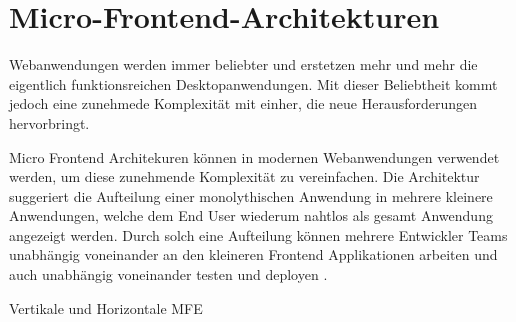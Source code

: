 \chapter{Micro-Frontend-Architekturen}
\label{ch:background}
Webanwendungen werden immer beliebter und erstetzen mehr und mehr die eigentlich funktionsreichen Desktopanwendungen. Mit dieser Beliebtheit kommt jedoch eine zunehmede Komplexität mit einher, die neue Herausforderungen hervorbringt. 

Micro Frontend Architekuren können in modernen Webanwendungen verwendet werden, um diese zunehmende Komplexität zu vereinfachen. Die Architektur suggeriert die Aufteilung einer monolythischen Anwendung in mehrere kleinere Anwendungen, welche dem End User wiederum nahtlos als gesamt Anwendung angezeigt werden. Durch solch eine Aufteilung können mehrere Entwickler Teams unabhängig voneinander an den kleineren Frontend Applikationen arbeiten und auch unabhängig voneinander testen und deployen \cite{10.1007/978-3-031-22792-9_8}.

Vertikale und Horizontale MFE






